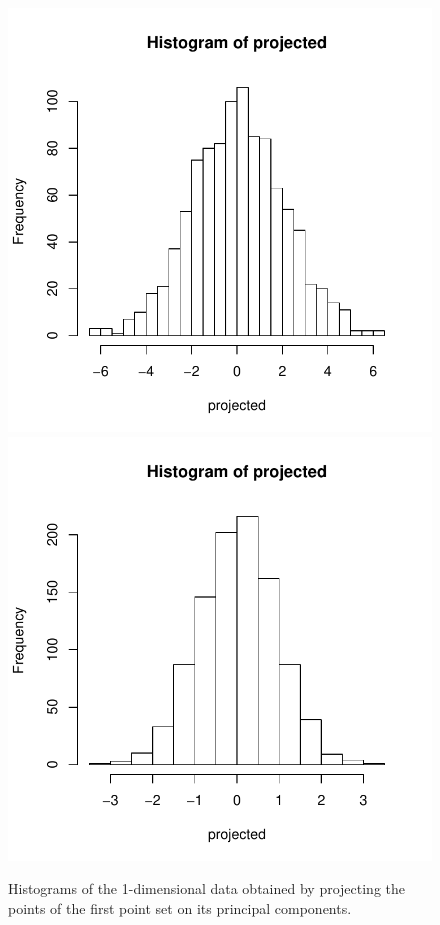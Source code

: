 \documentclass{article}
\begin{document}
\begin{figure}
	\centering
	\includegraphics[scale=\sscale]{histo1-1}
	\includegraphics[scale=\sscale]{histo1-2}
	\caption{Histograms of the 1-dimensional data obtained by projecting the points of the first point set on its principal components.}
	\label{fig:histo}
\end{figure}
\end{document}
